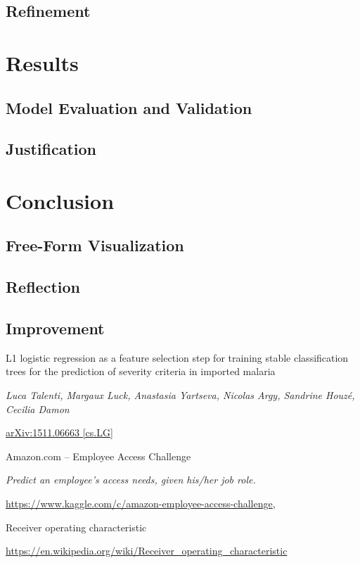 \documentclass[11pt]{article}
\begin{document}
\subsection{Refinement}

\section{Results}

\subsection{Model Evaluation and Validation}

\subsection{Justification}

\section{Conclusion}

\subsection{Free-Form Visualization}

\subsection{Reflection}

\subsection{Improvement}

\begin{thebibliography}{9}

    L1 logistic regression as a feature selection step for training stable 
    classification trees for the prediction of severity criteria in imported malaria

    \textit{Luca Talenti, Margaux Luck, Anastasia Yartseva, Nicolas Argy, Sandrine Houzé, Cecilia Damon}

    \href{https://arxiv.org/abs/1511.06663}{arXiv:1511.06663 [cs.LG]}

    Amazon.com -- Employee Access Challenge 

    \textit{Predict an employee's access needs, given his/her job role.}

    \href{https://www.kaggle.com/c/amazon-employee-access-challenge}
    {https://www.kaggle.com/c/amazon-employee-access-challenge},


    Receiver operating characteristic 

    \href{https://en.wikipedia.org/wiki/Receiver_operating_characteristic}
    {https://en.wikipedia.org/wiki/Receiver\_operating\_characteristic}

\end{thebibliography}
\end{document}

